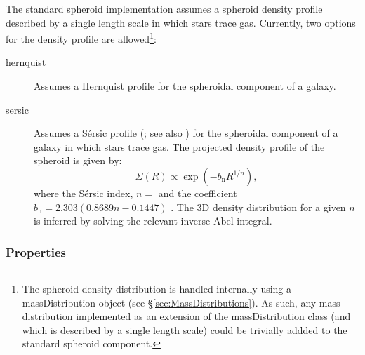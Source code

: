 The standard spheroid implementation assumes a spheroid density profile described by a single length scale in which stars trace gas. Currently, two options for the density profile are allowed\footnote{The spheroid density distribution is handled internally using a {\normalfont \ttfamily massDistribution} object (see \S\ref{sec:MassDistributions}). As such, any mass distribution implemented as an extension of the {\normalfont \ttfamily massDistribution} class (and which is described by a single length scale) could be trivially addded to the standard spheroid component.}:
\begin{description}
\item [{\normalfont \ttfamily hernquist}] Assumes a Hernquist profile \citep{hernquist_analytical_1990} for the spheroidal \gls{component} of a galaxy.
\item [{\normalfont \ttfamily sersic}] Assumes a S\'ersic profile (\citealt{sersic_influence_1963}; see also \citealt{mazure_exact_2002}) for the spheroidal \gls{component} of a galaxy in which stars trace gas. The projected density profile of the spheroid is given by:
\begin{equation}
 \Sigma(R) \propto \exp\left(-b_{\mathrm n} R^{1/n} \right),
\end{equation}
where the S\'ersic index, $n=${\normalfont \ttfamily [spheroidSersicIndex]} and the coefficient $b_{\mathrm n}=2.303(0.8689 n-0.1447)$ \cite{wadadekar_two-dimensional_1999}. The 3D density distribution for a given $n$ is inferred by solving the relevant inverse Abel integral.
\end{description}

\subsubsection{Properties}

